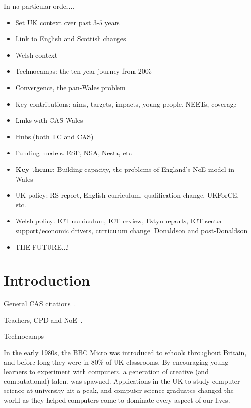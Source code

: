 \documentclass{sig-alternate}
\begin{document}
In no particular order...

\begin{itemize}
\item Set UK context over past 3-5 years
\item Link to English and Scottish changes
\item Welsh context
\item Technocamps: the ten year journey from 2003
\item Convergence, the pan-Wales problem
\item Key contributions: aims, targets, impacts, young people, NEETs, coverage
\item Links with CAS Wales
\item Hubs (both TC and CAS)
\item Funding models: ESF, NSA, Nesta, etc
\item {\textbf{Key theme}}: Building capacity, the problems of
  England's NoE model in Wales
\item UK policy: RS report, English curriculum, qualification change,
  UKForCE, etc.
\item Welsh policy: ICT curriculum, ICT review, Estyn reports, ICT
  sector support/economic drivers, curriculum change,
  Donaldson and post-Donaldson
\item THE FUTURE...!
\end{itemize}


\section{Introduction}
General CAS
citations~\cite{crick+sentance:2011,brown-et-al-sigcse2012,brown-et-al-toce2014}.

Teachers, CPD and
NoE~\cite{sentance-et-al-wipsce2012,sentance-et-al:2013,sentance-et-al:2014}.

Technocamps~\cite{ball-et-al:2012,boyle-et-al:2012}

In the early 1980s, the BBC Micro was introduced to schools throughout
Britain, and before long they were in 80\% of UK classrooms. By
encouraging young learners to experiment with computers, a generation
of creative (and computational) talent was spawned. Applications in
the UK to study computer science at university hit a peak, and
computer science graduates changed the world as they helped computers
come to dominate every aspect of our lives.
\end{document}
